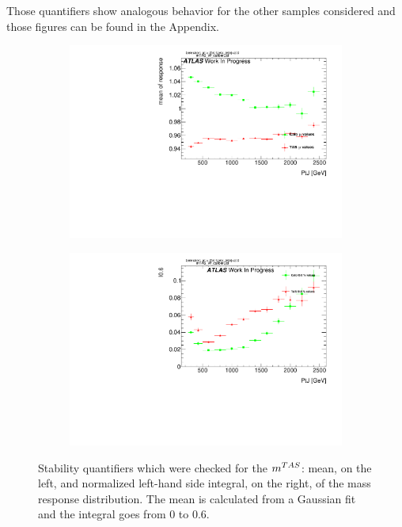 Those quantifiers show analogous behavior for the other samples considered and those figures can be found in the Appendix.

\begin{figure}
    \centering
    \begin{subfigure}[b]{0.45\textwidth}
	\centering
        \includegraphics[width=\textwidth]{appendixB/mTAS_W_calibmCal_20:07:01-03-11-2016/71graph_h_JetRatio_mJ12CALO_meanResponseMvsTA.pdf}
    \end{subfigure}
    \begin{subfigure}[b]{0.45\textwidth}
	\centering
        \includegraphics[width=\textwidth]{appendixB/mTAS_W_calibmCal_20:07:01-03-11-2016/74graph_h_JetRatio_mJ12CALO_I50ResponseMvsTAnorm.pdf}
 
    \end{subfigure}
    \caption[Mean and left-hand side integral for boosted $W/Z$]{Stability quantifiers which were checked for the $m^{TAS}$: mean, on the left, and normalized left-hand side integral, on the right, of the mass response distribution. The mean is calculated from a Gaussian fit and the integral goes from 0 to 0.6.} 
    \label{fig:meanandtail}
\end{figure}

